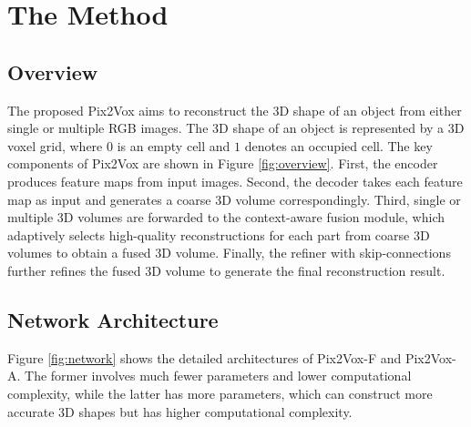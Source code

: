 \documentclass[10pt,twocolumn,letterpaper]{article}
\begin{document}
\section{The Method}

\subsection{Overview}

The proposed Pix2Vox aims to reconstruct the 3D shape of an object from either single or multiple RGB images. 
The 3D shape of an object is represented by a 3D voxel grid, where $0$ is an empty cell and $1$ denotes an occupied cell.
The key components of Pix2Vox are shown in Figure \ref{fig:overview}.
First, the encoder produces feature maps from input images.
Second, the decoder takes each feature map as input and generates a coarse 3D volume correspondingly.
Third, single or multiple 3D volumes are forwarded to the context-aware fusion module, which adaptively selects high-quality reconstructions for each part from coarse 3D volumes to obtain a fused 3D volume.
Finally, the refiner with skip-connections further refines the fused 3D volume to generate the final reconstruction result.

\subsection{Network Architecture}

Figure \ref{fig:network} shows the detailed architectures of Pix2Vox-F and Pix2Vox-A.
The former involves much fewer parameters and lower computational complexity, while the latter has more parameters, which can construct more accurate 3D shapes but has higher computational complexity.

\vspace{-3 mm}
\end{document}

